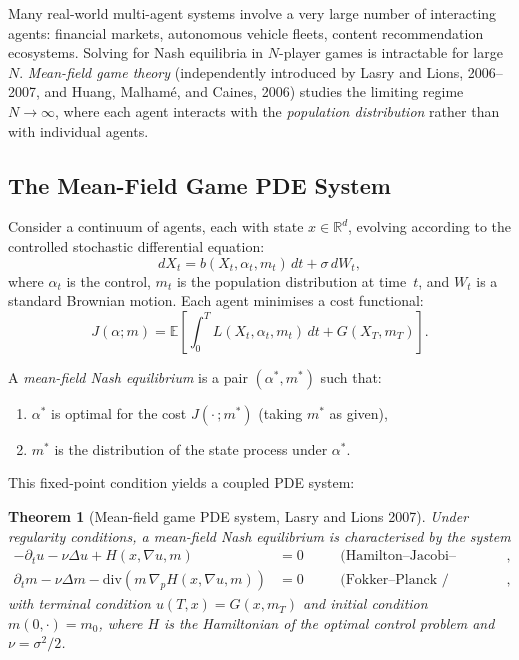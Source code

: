 \documentclass[11pt,a4paper]{article}
\theoremstyle{plain}
\newtheorem{theorem}{Theorem}[section]
\theoremstyle{definition}
\newcommand{\R}{\mathbb{R}}
\newcommand{\E}{\mathbb{E}}
\begin{document}
Many real-world multi-agent systems involve a very large number of
interacting agents: financial markets, autonomous vehicle fleets, content
recommendation ecosystems.  Solving for Nash equilibria in $N$-player
games is intractable for large $N$.  \emph{Mean-field game theory}
(independently introduced by Lasry and Lions, 2006--2007, and Huang,
Malham\'e, and Caines, 2006) studies the limiting regime $N \to \infty$,
where each agent interacts with the \emph{population distribution}
rather than with individual agents.

\subsection{The Mean-Field Game PDE System}

Consider a continuum of agents, each with state $x \in \R^d$, evolving
according to the controlled stochastic differential equation:
\[
  dX_t = b(X_t, \alpha_t, m_t)\,dt + \sigma\,dW_t,
\]
where $\alpha_t$ is the control, $m_t$ is the population distribution at
time~$t$, and $W_t$ is a standard Brownian motion.  Each agent minimises
a cost functional:
\[
  J(\alpha; m) = \E\left[
    \int_0^T L(X_t, \alpha_t, m_t)\,dt + G(X_T, m_T)
  \right].
\]

A \emph{mean-field Nash equilibrium} is a pair $(\alpha^*, m^*)$ such
that:
\begin{enumerate}
  \item $\alpha^*$ is optimal for the cost $J(\cdot\,; m^*)$ (taking
    $m^*$ as given),
  \item $m^*$ is the distribution of the state process under $\alpha^*$.
\end{enumerate}

This fixed-point condition yields a coupled PDE system:

\begin{theorem}[Mean-field game PDE system, Lasry and Lions 2007]
Under regularity conditions, a mean-field Nash equilibrium is
characterised by the system
\begin{align}
  -\partial_t u - \nu\Delta u + H(x, \nabla u, m) &= 0
    &\quad &\text{(Hamilton--Jacobi--Bellman, backward)},
    \label{eq:hjb} \\
  \partial_t m - \nu\Delta m
    - \mathrm{div}\!\left(m\,\nabla_p H(x, \nabla u, m)\right) &= 0
    &\quad &\text{(Fokker--Planck / Kolmogorov, forward)},
    \label{eq:fp}
\end{align}
with terminal condition $u(T,x) = G(x, m_T)$ and initial condition
$m(0, \cdot) = m_0$, where $H$ is the Hamiltonian of the optimal control
problem and $\nu = \sigma^2/2$.
\end{theorem}
\end{document}
